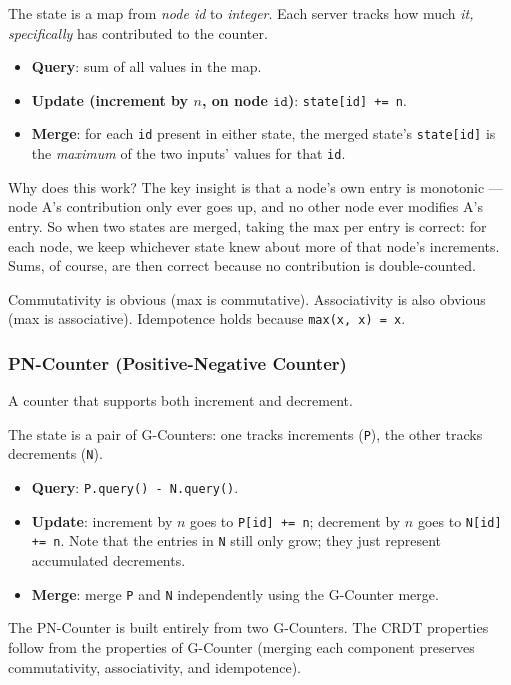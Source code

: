 \documentclass[11pt,a4paper]{article}
\begin{document}
The state is a map from \textit{node id} to \textit{integer}. Each server tracks how much \textit{it, specifically} has contributed to the counter.

\begin{itemize}
\item \textbf{Query}: sum of all values in the map.
\item \textbf{Update (increment by $n$, on node $\texttt{id}$)}: \texttt{state[id] += n}.
\item \textbf{Merge}: for each \texttt{id} present in either state, the merged state's \texttt{state[id]} is the \textit{maximum} of the two inputs' values for that \texttt{id}.
\end{itemize}

Why does this work? The key insight is that a node's own entry is monotonic --- node A's contribution only ever goes up, and no other node ever modifies A's entry. So when two states are merged, taking the max per entry is correct: for each node, we keep whichever state knew about more of that node's increments. Sums, of course, are then correct because no contribution is double-counted.

Commutativity is obvious (max is commutative). Associativity is also obvious (max is associative). Idempotence holds because \texttt{max(x, x) = x}.

\subsubsection{PN-Counter (Positive-Negative Counter)}
A counter that supports both increment and decrement.

The state is a pair of G-Counters: one tracks increments (\texttt{P}), the other tracks decrements (\texttt{N}).

\begin{itemize}
\item \textbf{Query}: \texttt{P.query() - N.query()}.
\item \textbf{Update}: increment by $n$ goes to \texttt{P[id] += n}; decrement by $n$ goes to \texttt{N[id] += n}. Note that the entries in \texttt{N} still only grow; they just represent accumulated decrements.
\item \textbf{Merge}: merge \texttt{P} and \texttt{N} independently using the G-Counter merge.
\end{itemize}

The PN-Counter is built entirely from two G-Counters. The CRDT properties follow from the properties of G-Counter (merging each component preserves commutativity, associativity, and idempotence).
\end{document}
